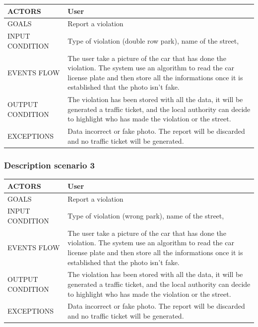 \begin{center}
	\begin{tabular}{ | l | p{6cm} | } 
		\hline
		ACTORS & User  \\ 
		\hline
		GOALS & Report a violation  \\ 
		\hline
		INPUT CONDITION & Type of violation (double row park), name of the street,  \\ 
		\hline
		EVENTS FLOW & The user take a picture of the car that has done the violation. The system use an algorithm to read the car license plate and then store all the informations once it is established that the photo isn't fake.  \\ 
		\hline
		OUTPUT CONDITION & The violation has been stored with all the data, it will be generated a traffic ticket, and the local authority can decide to highlight who has made the violation or the street. \\ 
		\hline
		EXCEPTIONS & Data incorrect or fake photo. The report will be discarded and no traffic ticket will be generated.  \\ 
		\hline
	\end{tabular}
\end{center}

\subsubsection{Description scenario 3}

\begin{center}
	\begin{tabular}{ | l | p{6cm} | } 
		\hline
		ACTORS & User  \\ 
		\hline
		GOALS & Report a violation  \\ 
		\hline
		INPUT CONDITION & Type of violation (wrong park), name of the street,  \\ 
		\hline
		EVENTS FLOW & The user take a picture of the car that has done the violation. The system use an algorithm to read the car license plate and then store all the informations once it is established that the photo isn't fake.  \\ 
		\hline
		OUTPUT CONDITION & The violation has been stored with all the data, it will be generated a traffic ticket, and the local authority can decide to highlight who has made the violation or the street. \\ 
		\hline
		EXCEPTIONS & Data incorrect or fake photo. The report will be discarded and no traffic ticket will be generated.  \\ 
		\hline
	\end{tabular}
\end{center}

